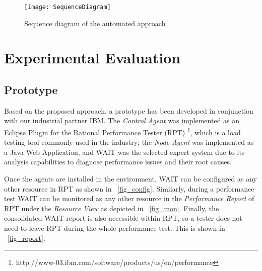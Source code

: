 \documentclass[runningheads,a4paper]{llncs}
\begin{document}
\vspace{-5pt}
\begin{figure}[!h]
\centering
\texttt{[image: SequenceDiagram]}
\caption{Sequence diagram of the automated approach}
\label{fig_SeqDiagram}
\end{figure}
\vspace{-5pt}

\vspace{5pt}
\section{Experimental Evaluation}
\label{ExperimentalEvaluation}


\vspace{-5pt}
\subsection{Prototype}
\vspace{-5pt}
Based on the proposed approach, a prototype has been developed
in conjunction with our industrial partner IBM. The \emph{Control Agent} was
implemented as an Eclipse Plugin for the Rational Performance Tester (RPT)
\footnote{http://www-03.ibm.com/software/products/us/en/performance}, which is a
load testing tool commonly used in the industry; the \emph{Node Agent} was
implemented as a Java Web Application, and WAIT was the selected expert system
due to its analysis capabilities to diagnose performance issues and their root
causes.

Once the agents are installed in the environment, WAIT can be configured as
any other resource in RPT as shown in \figurename ~\ref{fig_config}. Similarly, during a
performance test WAIT can be monitored as any other resource in the
\emph{Performance Report} of RPT under the \emph{Resource View} as depicted in
\figurename ~\ref{fig_mon}. Finally, the consolidated WAIT report is also
accessible within RPT, so a tester does not need to leave RPT during the whole
performance test. This is shown in \figurename ~\ref{fig_report}.
\end{document}
